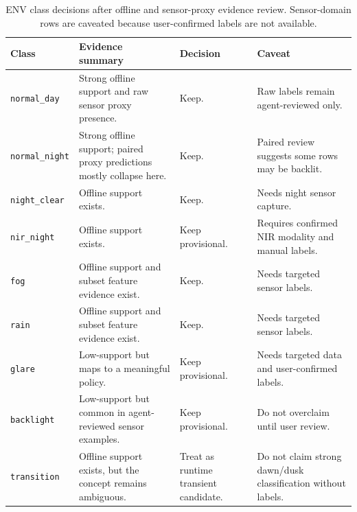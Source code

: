 \begin{table}[!htbp]
\centering
\footnotesize
\caption{ENV class decisions after offline and sensor-proxy evidence review. Sensor-domain rows are caveated because user-confirmed labels are not available.}
\label{tab:ch6-ml-class-decisions}
\begin{tabularx}{\textwidth}{@{}lXXX@{}}
\hline
\textbf{Class} & \textbf{Evidence summary} & \textbf{Decision} & \textbf{Caveat} \\
\hline
\texttt{normal\_day} & Strong offline support and raw sensor proxy presence. & Keep. & Raw labels remain agent-reviewed only. \\
\texttt{normal\_night} & Strong offline support; paired proxy predictions mostly collapse here. & Keep. & Paired review suggests some rows may be backlit. \\
\texttt{night\_clear} & Offline support exists. & Keep. & Needs night sensor capture. \\
\texttt{nir\_night} & Offline support exists. & Keep provisional. & Requires confirmed NIR modality and manual labels. \\
\texttt{fog} & Offline support and subset feature evidence exist. & Keep. & Needs targeted sensor labels. \\
\texttt{rain} & Offline support and subset feature evidence exist. & Keep. & Needs targeted sensor labels. \\
\texttt{glare} & Low-support but maps to a meaningful policy. & Keep provisional. & Needs targeted data and user-confirmed labels. \\
\texttt{backlight} & Low-support but common in agent-reviewed sensor examples. & Keep provisional. & Do not overclaim until user review. \\
\texttt{transition} & Offline support exists, but the concept remains ambiguous. & Treat as runtime transient candidate. & Do not claim strong dawn/dusk classification without labels. \\
\hline
\end{tabularx}
\end{table}
